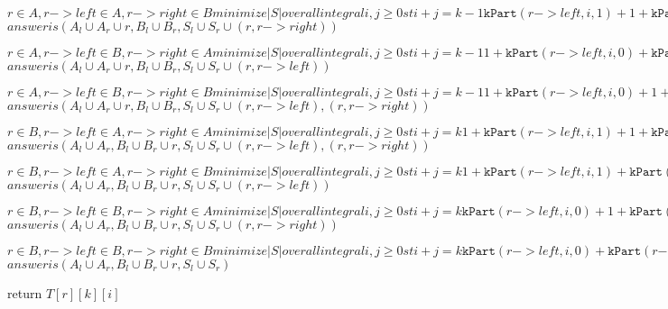 \documentclass[11pt]{article}
\begin{document}
          $r \in A, r->left \in A, r->right \in B
              minimize |S| over all integral i,j \geq 0 st i+j = k-1
                    \mathtt{kPart}(r->left,i,1) + 1 + \mathtt{kPart}(r->right,j,0)$
                $answer is (A_l \cup A_r \cup {r},B_l \cup B_r,S_l \cup S_r \cup {(r, r->right)})$

          $r \in A, r->left \in B, r->right \in A
              minimize |S| over all integral i,j \geq 0 st i+j = k-1
                1 + \mathtt{kPart}(r->left,i,0) +     \mathtt{kPart}(r->right,j,1)$
                $answer is (A_l \cup A_r \cup {r},B_l \cup B_r,S_l \cup S_r \cup {(r, r->left)})$

          $r \in A, r->left \in B, r->right \in B
              minimize |S| over all integral i,j \geq 0 st i+j = k-1
                1 + \mathtt{kPart}(r->left,i,0) + 1 + \mathtt{kPart}(r->right,j,0)$
                $answer is (A_l \cup A_r \cup {r},B_l \cup B_r,S_l \cup S_r \cup {(r, r->left),(r, r->right)})$

          $r \in B, r->left \in A, r->right \in A
              minimize |S| over all integral i,j \geq 0 st i+j = k
                1 + \mathtt{kPart}(r->left,i,1) + 1 + \mathtt{kPart}(r->right,j,1)$
                $answer is (A_l \cup A_r,B_l \cup B_r \cup {r},S_l \cup S_r \cup {(r, r->left),(r, r->right)})$

          $r \in B, r->left \in A, r->right \in B
              minimize |S| over all integral i,j \geq 0 st i+j = k
                1 + \mathtt{kPart}(r->left,i,1) +     \mathtt{kPart}(r->right,j,0)$
                $answer is (A_l \cup A_r,B_l \cup B_r \cup {r},S_l \cup S_r \cup {(r, r->left)})$

          $r \in B, r->left \in B, r->right \in A
              minimize |S| over all integral i,j \geq 0 st i+j = k
                    \mathtt{kPart}(r->left,i,0) + 1 + \mathtt{kPart}(r->right,j,1)$
                $answer is (A_l \cup A_r,B_l \cup B_r \cup {r},S_l \cup S_r \cup {(r, r->right)})$

          $r \in B, r->left \in B, r->right \in B
              minimize |S| over all integral i,j \geq 0 st i+j = k
                    \mathtt{kPart}(r->left,i,0) +     \mathtt{kPart}(r->right,j,0)$
                $answer is (A_l \cup A_r,B_l \cup B_r \cup {r},S_l \cup S_r)$


   return $T[r][k][i]$
\end{document}
